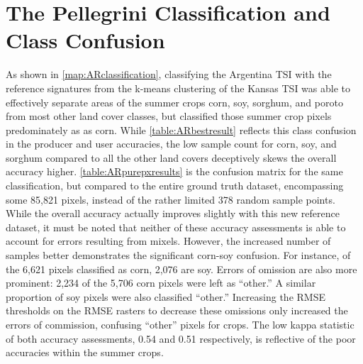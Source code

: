 \section{The Pellegrini Classification and Class Confusion}

As shown in \autoref{map:ARclassification}, classifying the Argentina TSI with the reference signatures from the k-means clustering of the Kansas TSI was able to effectively separate areas of the summer crops corn, soy, sorghum, and poroto from most other land cover classes, but classified those summer crop pixels predominately as as corn. While \autoref{table:ARbestresult} reflects this class confusion in the producer and user accuracies, the low sample count for corn, soy, and sorghum compared to all the other land covers deceptively skews the overall accuracy higher. \autoref{table:ARpurepxresults} is the confusion matrix for the same classification, but compared to the entire ground truth dataset, encompassing some 85,821 pixels, instead of the rather limited 378 random sample points. While the overall accuracy actually improves slightly with this new reference dataset, it must be noted that neither of these accuracy assessments is able to account for errors resulting from mixels. However, the increased number of samples better demonstrates the significant corn-soy confusion. For instance, of the 6,621 pixels classified as corn, 2,076 are soy. Errors of omission are also more prominent: 2,234 of the 5,706 corn pixels were left as ``other.'' A similar proportion of soy pixels were also classified ``other.'' Increasing the RMSE thresholds on the RMSE rasters to decrease these omissions only increased the errors of commission, confusing ``other'' pixels for crops. The low kappa statistic of both accuracy assessments, 0.54 and 0.51 respectively, is reflective of the poor accuracies within the summer crops.

